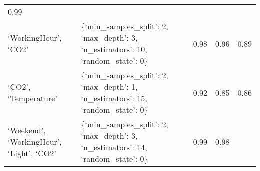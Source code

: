 \documentclass[11pt]{article}
\begin{document}
\begin{longtable}[]{@{}lllll@{}}
\begin{minipage}[t]{0.05\columnwidth}
0.99\strut
\end{minipage}\tabularnewline
\begin{minipage}[t]{0.25\columnwidth}\raggedright
`WorkingHour', `CO2'\strut
\end{minipage} & \begin{minipage}[t]{0.47\columnwidth}\raggedright
\{`min\_samples\_split': 2, `max\_depth': 3, `n\_estimators': 10,
`random\_state': 0\}\strut
\end{minipage} & \begin{minipage}[t]{0.05\columnwidth}\raggedright
0.98\strut
\end{minipage} & \begin{minipage}[t]{0.05\columnwidth}\raggedright
0.96\strut
\end{minipage} & \begin{minipage}[t]{0.05\columnwidth}\raggedright
0.89\strut
\end{minipage}\tabularnewline
\begin{minipage}[t]{0.25\columnwidth}\raggedright
`CO2', `Temperature'\strut
\end{minipage} & \begin{minipage}[t]{0.47\columnwidth}\raggedright
\{`min\_samples\_split': 2, `max\_depth': 1, `n\_estimators': 15,
`random\_state': 0\}\strut
\end{minipage} & \begin{minipage}[t]{0.05\columnwidth}\raggedright
0.92\strut
\end{minipage} & \begin{minipage}[t]{0.05\columnwidth}\raggedright
0.85\strut
\end{minipage} & \begin{minipage}[t]{0.05\columnwidth}\raggedright
0.86\strut
\end{minipage}\tabularnewline
\begin{minipage}[t]{0.25\columnwidth}\raggedright
`Weekend', `WorkingHour', `Light', `CO2'\strut
\end{minipage} & \begin{minipage}[t]{0.47\columnwidth}\raggedright
\{`min\_samples\_split': 2, `max\_depth': 3, `n\_estimators': 14,
`random\_state': 0\}\strut
\end{minipage} & \begin{minipage}[t]{0.05\columnwidth}\raggedright
0.99\strut
\end{minipage} & \begin{minipage}[t]{0.05\columnwidth}\raggedright
0.98\strut
\end{minipage} & \begin{minipage}[t]{0.05\columnwidth}\raggedright

\end{minipage}
\end{longtable}
\end{document}
